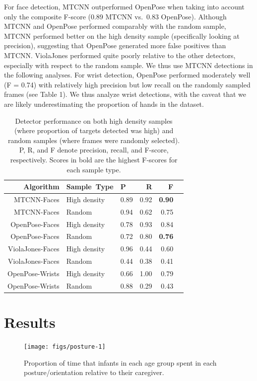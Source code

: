 \documentclass[10pt, letterpaper]{article}
\newenvironment{CodeChunk}{}{}
\begin{document}
For face detection, MTCNN outperformed OpenPose when taking into account
only the composite F-score (0.89 MTCNN vs.~0.83 OpenPose). Although
MTCNN and OpenPose performed comparably with the random sample, MTCNN
performed better on the high density sample (specifically looking at
precision), suggesting that OpenPose generated more false positives than
MTCNN. ViolaJones performed quite poorly relative to the other
detectors, especially with respect to the random sample. We thus use
MTCNN detections in the following analyses. For wrist detection,
OpenPose performed moderately well (F = 0.74) with relatively high
precision but low recall on the randomly sampled frames (see Table 1).
We thus analyze wrist detections, with the caveat that we are likely
underestimating the proportion of hands in the dataset.

\begin{table}[ht]
\centering
\begin{tabular}{rllrrr}
\hline
Algorithm & Sample\ Type & P & R & F \\ 
\hline
MTCNN-Faces & High density & 0.89 & 0.92 & \textbf{0.90} \\ 
MTCNN-Faces & Random & 0.94 & 0.62 & 0.75 \\ 
OpenPose-Faces & High density & 0.78 & 0.93 & 0.84 \\ 
OpenPose-Faces & Random & 0.72 & 0.80 & \textbf{0.76} \\ 
ViolaJones-Faces & High density & 0.96 & 0.44 & 0.60 \\ 
ViolaJones-Faces & Random & 0.44 & 0.38 & 0.41 \\ 
OpenPose-Wrists & High density & 0.66 & 1.00 & 0.79 \\ 
OpenPose-Wrists & Random & 0.88 & 0.29 & 0.43 \\ 
\hline
\end{tabular}
\caption{Detector performance on both high density samples (where proportion of targets detected was high) and random samples (where frames were randomly selected). P, R, and F denote precision, recall, and F-score, respectively. Scores in bold are the highest F-scores for each sample type.} 
\vspace{-1em}
\end{table}

\section{Results}\label{results}

\begin{CodeChunk}
\begin{figure}[h]

{\centering \texttt{[image: figs/posture-1]} 

}

\caption[Proportion of time that infants in each age group spent in each posture/orientation relative to their caregiver]{Proportion of time that infants in each age group spent in each posture/orientation relative to their caregiver.}\label{fig:posture}
\end{figure}
\end{CodeChunk}
\end{document}
